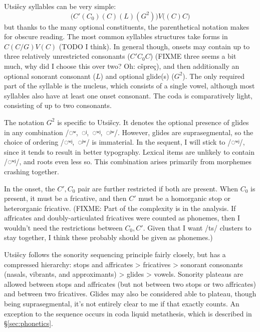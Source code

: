 \documentclass[12pt]{book} %
\begin{document}
Utsišcy syllables can be very simple:
$$\big( C'(C_0)(C)(L) (G^2) \big)V \big( (C)C \big)$$
but thanks to the many optional constituents, the parenthetical notation makes for obscure reading.
The most common syllables structures take forms in $C(C/G)V(C)$ (TODO I think).
In general though, onsets may contain up to three relatively unrestricted consonants ($C' C_0 C$) (FIXME three seems a bit much, why did I choose this over two? Oh: cšpreç), and then additionally an optional sonorant consonant ($L$) and optional glide(s) ($G^2$).
The only required part of the syllable is the nucleus, which consists of a single vowel, although most syllables also have at least one onset consonant.
The coda is comparatively light, consisting of up to two consonants.

The notation $G^2$ is specific to Utsišcy.
It denotes the optional presence of glides in any combination /◌ʷ,~◌ʲ,~◌ʷʲ,~◌ʲʷ/.
However, glides are suprasegmental, so the choice of ordering /◌ʷʲ,~◌ʲʷ/ is immaterial.
In the sequent, I will stick to /◌ʷʲ/, since it tends to result in better typography.
Lexical items are unlikely to contain /◌ʷʲ/, and roots even less so.
This combination arises primarily from morphemes crashing together.

In the onset, the $C', C_0$ pair are further restricted if both are present.
When $C_0$ is present, it must be a fricative, and then $C'$ must be a homorganic stop or heterorganic fricative.
(FIXME: Part of the complexity is in the analysis.
If affricates and doubly-articulated fricatives were counted as phonemes, then I wouldn't need the restrictions between $C_0, C'$.
Given that I want /ts/ clusters to stay together, I think these probably should be given as phonemes.)

Utsišcy follows the sonority sequencing principle fairly closely, but has a compressed hierarchy: stops and affricates > fricatives > sonorant consonants (nasals, vibrants, and approximants) > glides > vowels.
Sonority plateaus are allowed between stops and affricates (but not between two stops or two affricates) and between two fricatives.
Glides may also be considered able to plateau, though being suprasegmental, it's not entirely clear to me if that exactly counts.
An exception to the sequence occurs in coda liquid metathesis, which is described in §\ref{sec:phonetics}.
\end{document}
